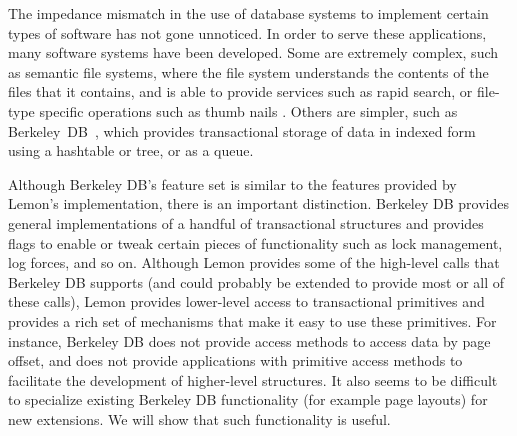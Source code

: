 \documentclass[10pt,letterpaper,twocolumn,english]{article}
\newcommand{\yad}{Lemon\xspace}
\begin{document}
The impedance mismatch in the use of database systems to implement
certain types of software has not gone unnoticed.
%
%
%
In
order to serve these applications, many software systems have been 
developed.  Some are extremely complex, such as semantic file
systems, where the file system understands the contents of the files
that it contains, and is able to provide services such as rapid
search, or file-type specific operations such as thumb nails \cite{reiser,semantic}.  Others are simpler, such as
Berkeley~DB~\cite{bdb, berkeleyDB}, which provides transactional
storage of data in indexed form using a hashtable or tree, or as a queue.  

Although Berkeley DB's feature set is similar to the features provided by
\yad's implementation, there is an important distinction.  Berkeley DB
provides general implementations of a handful of transactional
structures and provides flags to enable or tweak certain pieces of
functionality such as lock management, log forces, and so on. Although
\yad provides some of the high-level calls that Berkeley DB supports
(and could probably be extended to provide most or all of these calls), \yad
provides lower-level access to transactional primitives and provides a rich 
set of mechanisms that make it easy to use these primitives.  For
instance, Berkeley DB does not provide access methods to access data by 
page offset, and does not provide applications with primitive 
access methods to facilitate the development of higher-level structures.
It also seems to be difficult to specialize existing Berkeley DB functionality 
(for example page layouts) for new extensions.  We will show that such functionality is useful.

\end{document}
